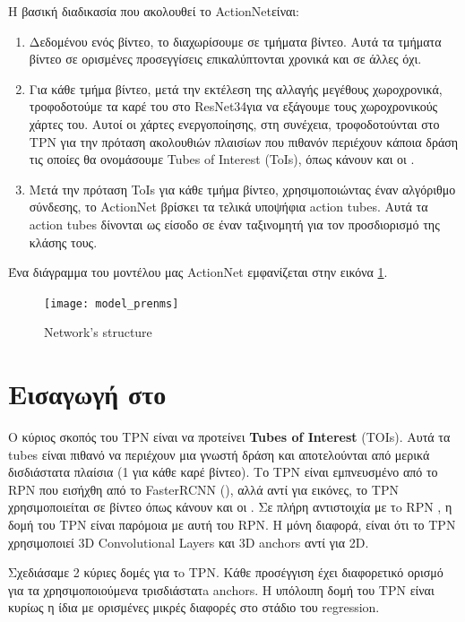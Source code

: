 Η βασική διαδικασία που ακολουθεί το \en ActionNet\gr είναι:
\begin{enumerate}
\item Δεδομένου ενός βίντεο, το διαχωρίσουμε σε τμήματα βίντεο. Αυτά τα τμήματα βίντεο  σε ορισμένες προσεγγίσεις επικαλύπτονται χρονικά και σε άλλες όχι.
\item Για κάθε τμήμα βίντεο, μετά την εκτέλεση της αλλαγής μεγέθους χωροχρονικά, τροφοδοτούμε τα καρέ του στο \en ResNet34\gr για να εξάγουμε τους χωροχρονικούς
  χάρτες του. Αυτοί οι χάρτες ενεργοποίησης, στη συνέχεια, τροφοδοτούνται στο \en TPN \gr για την πρόταση ακολουθιών πλαισίων που πιθανόν περιέχουν κάποια δράση τις οποίες 
  θα  ονομάσουμε \en Tubes of Interest (ToIs)\gr, όπως κάνουν και οι \en \cite{DBLP:journals/corr/HouCS17}\gr .
\item Μετά την πρόταση \en ToIs \gr για κάθε τμήμα βίντεο, χρησιμοποιώντας έναν αλγόριθμο σύνδεσης, το \en ActionNet \gr βρίσκει τα τελικά υποψήφια \en action tubes\gr.
 Αυτά τα \en action tubes \gr δίνονται ως είσοδο σε έναν ταξινομητή για τον προσδιορισμό της κλάσης τους.
\end{enumerate}

Ένα διάγραμμα του μοντέλου μας \en ActionNet \gr εμφανίζεται στην εικόνα \ref{fig:gr_whole_network_}. 

\begin{figure}[h]
  \centering
  \texttt{[image: model\_prenms]}
  \caption{\en Network's structure}
  \label{fig:gr_whole_network_}
\end{figure}
\gr
\section{\gr Εισαγωγή στο }
Ο κύριος σκοπός του  \en TPN  \gr  είναι να προτείνει \en\textbf{Tubes of Interest} (TOIs)\gr. Αυτά τα \en  tubes \gr  είναι πιθανό να περιέχουν μια γνωστή δράση και αποτελούνται από μερικά
δισδιάστατα πλαίσια (1 για κάθε καρέ βίντεο). Το \en  TPN \gr  είναι εμπνευσμένο από το \en  RPN \gr  που εισήχθη από το \en   FasterRCNN (\cite{Ren:2015:FRT:2969239.2969250})\gr ,
αλλά αντί για εικόνες, το \en  TPN \gr  χρησιμοποιείται σε βίντεο όπως κάνουν και οι \en \cite{DBLP:journals/corr/HouCS17}\gr . Σε πλήρη αντιστοιχία με τo \en  RPN \gr , η δομή
του \en  TPN \gr  είναι παρόμοια με αυτή  του \en  RPN\gr . Η μόνη διαφορά, είναι ότι το  \en TPN \gr  χρησιμοποιεί \en  3D Convolutional Layers  \gr και \en  3D anchors \gr  αντί  για \en  2D\gr.  \par
Σχεδιάσαμε 2 κύριες δομές για τo \en  TPN\gr. Κάθε προσέγγιση έχει διαφορετικό ορισμό για τα χρησιμοποιούμενα τρισδιάστατa \en  anchors\gr. 
Η υπόλοιπη δομή του \en  TPN \gr  είναι κυρίως η ίδια με ορισμένες μικρές διαφορές στο στάδιο του  \en  regression. \gr  \par

